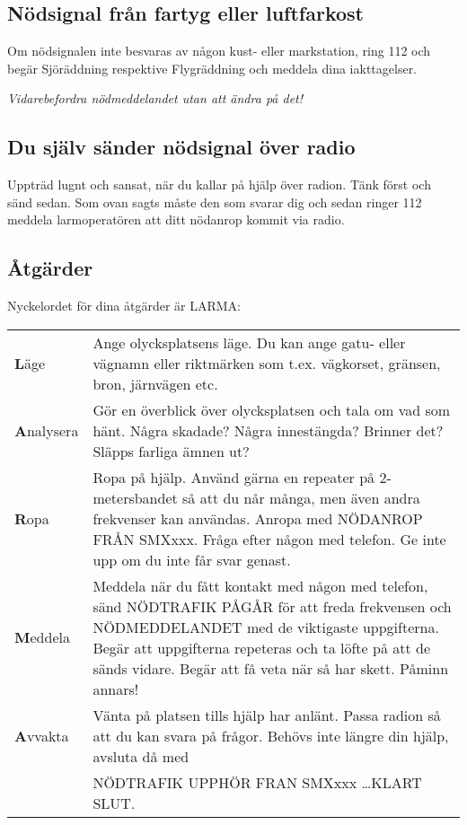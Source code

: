 \subsection{Nödsignal från fartyg eller luftfarkost}

Om nödsignalen inte besvaras av någon kust- eller markstation, ring 112
och begär Sjöräddning respektive Flygräddning och meddela dina iakttagelser.

\emph{Vidarebefordra nödmeddelandet utan att ändra på det!}

\subsection{Du själv sänder nödsignal över radio}

Uppträd lugnt och sansat, när du kallar på hjälp över radion.
Tänk först och sänd sedan.
Som ovan sagts måste den som svarar dig och sedan ringer 112 meddela
larmoperatören att ditt nödanrop kommit via radio.

\subsection{Åtgärder}

Nyckelordet för dina åtgärder är LARMA:

\begin{tabular}{lp{9cm}}
	\textbf{L}äge &
        Ange olycksplatsens läge.
        Du kan ange gatu- eller vägnamn eller riktmärken som
        t.ex. vägkorset, gränsen, bron, järnvägen etc.
	\\
	\textbf{A}nalysera
	&
        Gör en överblick över olycksplatsen och tala om vad som hänt.
        Några skadade? Några innestängda?
        Brinner det? Släpps farliga ämnen ut?
	\\
	\textbf{R}opa &
        Ropa på hjälp.
        Använd gärna en repeater på 2-metersbandet så att du når många,
        men även andra frekvenser kan användas.
        Anropa med NÖDANROP FRÅN SMXxxx.
        Fråga efter någon med telefon.
        Ge inte upp om du inte får svar genast.
	\\
	\textbf{M}eddela &
        Meddela när du fått kontakt med någon med telefon, sänd NÖDTRAFIK PÅGÅR
        för att freda frekvensen och NÖDMEDDELANDET med de viktigaste
        uppgifterna.
        Begär att uppgifterna repeteras och ta löfte på att de sänds vidare.
        Begär att få veta när så har skett.
        Påminn annars!
	\\
	\textbf{A}vvakta &
        Vänta på platsen tills hjälp har anlänt.
        Passa radion så att du kan svara på frågor.
        Behövs inte längre din hjälp, avsluta då med\\
	& NÖDTRAFIK UPPHÖR FRAN SMXxxx \dots KLART SLUT.
\end{tabular}
